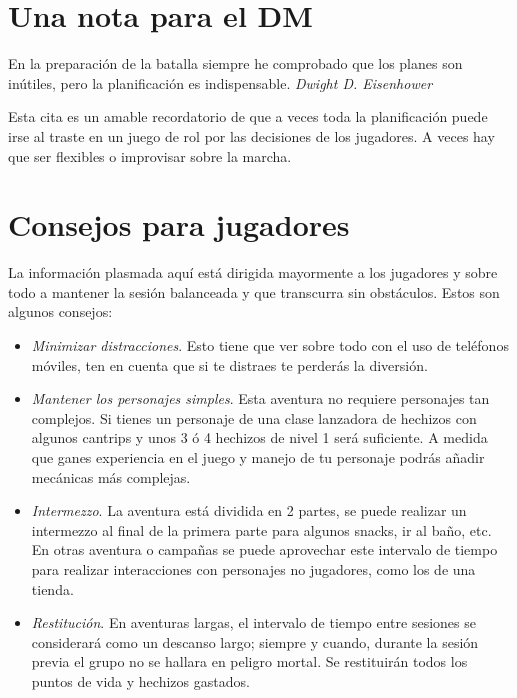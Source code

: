 \documentclass[10pt,twoside,twocolumn,openany]{dndbook}
\begin{document}
\section*{Una nota para el DM}

\begin{DndReadAloud}
  En la preparación de la batalla siempre he comprobado que los planes son inútiles, pero la 
  planificación es indispensable.
  \emph{Dwight D. Eisenhower}
\end{DndReadAloud}

Esta cita es un amable recordatorio de que a veces toda la planificación puede irse al traste 
en un juego de rol por las decisiones de los jugadores. A veces hay que ser flexibles o improvisar 
sobre la marcha.

\section*{Consejos para jugadores}

La información plasmada aquí está dirigida mayormente a los jugadores y sobre todo a mantener la 
sesión balanceada y que transcurra sin obstáculos. Estos son algunos consejos:

\begin{itemize}
  \item \emph{Minimizar distracciones}. Esto tiene que ver sobre todo con el uso de teléfonos 
  móviles, ten en cuenta que si te distraes te perderás la diversión.
  \item \emph{Mantener los personajes simples}. Esta aventura no requiere personajes tan complejos.
  Si tienes un personaje de una clase lanzadora de hechizos con algunos cantrips y unos 3 ó 4 
  hechizos de nivel 1 será suficiente. A medida que ganes experiencia en el juego y manejo de tu 
  personaje podrás añadir mecánicas más complejas.
  \item \emph{Intermezzo}. La aventura está dividida en 2 partes, se puede realizar un intermezzo 
  al final de la primera parte para algunos snacks, ir al baño, etc. En otras aventura o campañas
  se puede aprovechar este intervalo de tiempo para realizar interacciones con personajes no 
  jugadores, como los de una tienda.
  \item \emph{Restitución}. En aventuras largas, el intervalo de tiempo entre sesiones se 
  considerará como un descanso largo; siempre y cuando, durante la sesión previa el grupo no se 
  hallara en peligro mortal. Se restituirán todos los puntos de vida y hechizos gastados.
\end{itemize}
\end{document}
